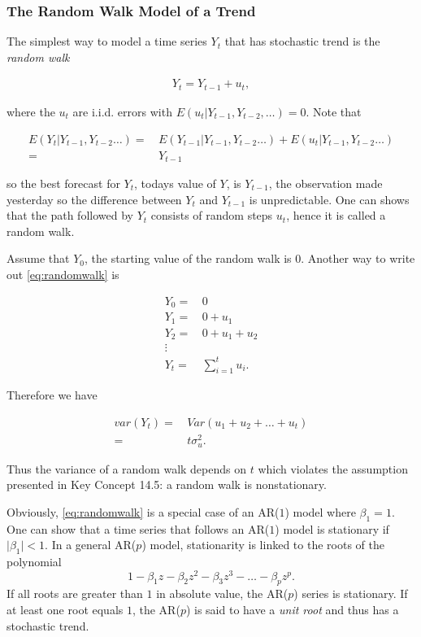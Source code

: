 \documentclass[]{book}
\theoremstyle{definition}
\theoremstyle{definition}
\theoremstyle{definition}
\theoremstyle{remark}
\begin{document}
\subsubsection*{The Random Walk Model of a
Trend}\label{the-random-walk-model-of-a-trend}

The simplest way to model a time series \(Y_t\) that has stochastic
trend is the \emph{random walk}

\begin{align}
  Y_t = Y_{t-1} + u_t, \label{eq:randomwalk}
\end{align}

where the \(u_t\) are i.i.d. errors with
\(E(u_t\vert Y_{t-1}, Y_{t-2}, \dots) = 0\). Note that

\begin{align*}
  E(Y_t\vert Y_{t-1}, Y_{t-2}\dots) =& \, E(Y_{t-1}\vert Y_{t-1}, Y_{t-2}\dots) + E(u_t\vert Y_{t-1}, Y_{t-2}\dots) \\
  =& \, Y_{t-1}
\end{align*}

so the best forecast for \(Y_t\), todays value of \(Y\), is \(Y_{t-1}\),
the observation made yesterday so the difference between \(Y_t\) and
\(Y_{t-1}\) is unpredictable. One can shows that the path followed by
\(Y_t\) consists of random steps \(u_t\), hence it is called a random
walk.

Assume that \(Y_0\), the starting value of the random walk is \(0\).
Another way to write out \eqref{eq:randomwalk} is

\begin{align*}
  Y_0 =& \, 0 \\
  Y_1 =& \, 0 + u_1 \\
  Y_2 =& \, 0 + u_1 + u_2 \\
  \vdots & \, \\
  Y_t =& \, \sum_{i=1}^t u_i.
\end{align*}

Therefore we have

\begin{align*}
  var(Y_t) =& \, Var(u_1 + u_2 + \dots + u_t) \\
           =& \, t \sigma_u^2.
\end{align*}

Thus the variance of a random walk depends on \(t\) which violates the
assumption presented in Key Concept 14.5: a random walk is
nonstationary.

Obviously, \eqref{eq:randomwalk} is a special case of an AR(\(1\)) model
where \(\beta_1 = 1\). One can show that a time series that follows an
AR(\(1\)) model is stationary if \(\lvert\beta_1\rvert < 1\). In a
general AR(\(p\)) model, stationarity is linked to the roots of the
polynomial
\[1-\beta_1 z - \beta_2 z^2 - \beta_3 z^3 - \dots - \beta_p z^p.\] If
all roots are greater than \(1\) in absolute value, the AR(\(p\)) series
is stationary. If at least one root equals \(1\), the AR(\(p\)) is said
to have a \emph{unit root} and thus has a stochastic trend.
\end{document}
